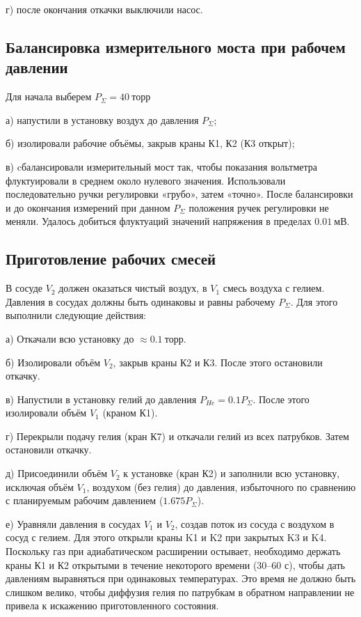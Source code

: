 \documentclass[a4paper, 10pt, twocolumn]{article}
\begin{document}
г) после окончания откачки выключили насос.

\subsection{Балансировка измерительного моста при рабочем давлении}

Для начала выберем $P_{\Sigma} = 40~торр$

а) напустили в установку воздух до давления $P_{\Sigma}$;

б) изолировали рабочие объёмы, закрыв краны К1, К2 (К3 открыт);

в) cбалансировали измерительный мост так, чтобы показания вольтметра флуктуировали в среднем около нулевого значения. Использовали последовательно ручки регулировки «грубо», затем «точно». После балансировки и до окончания измерений при данном $P_{\Sigma}$ положения ручек регулировки не меняли. Удалось добиться флуктуаций значений напряжения в пределах $0.01~мВ$.

\subsection{Приготовление рабочих смесей}

    В сосуде $V_2$ должен оказаться чистый воздух, в $V_1$ смесь воздуха с гелием. Давления в сосудах должны быть одинаковы и равны рабочему $P_{\Sigma}$. Для этого выполнили следующие действия:

    а) Откачали всю установку до $\approx 0.1~торр$.

    б) Изолировали объём $V_2$, закрыв краны К2 и К3. После этого остановили откачку.

    в) Напустили в установку гелий до давления $P_{He} = 0.1P_{\Sigma}$. После этого изолировали объём $V_1$ (краном К1).

    г) Перекрыли подачу гелия (кран К7) и откачали гелий из всех патрубков. Затем остановили откачку.

    д) Присоединили объём $V_2$ к установке (кран К2) и заполнили всю установку, исключая объём $V_1$, воздухом (без гелия) до давления, избыточного по сравнению с планируемым рабочим давлением ($1.675P_{\Sigma}$).

    е) Уравняли давления в сосудах $V_1$ и $V_2$, создав поток из сосуда с воздухом в сосуд с гелием. Для этого открыли краны K1 и K2 при закрытых K3 и K4. Поскольку газ при адиабатическом расширении остывает, необходимо держать краны К1 и К2 открытыми в течение некоторого времени (30–60 с), чтобы дать давлениям выравняться при одинаковых температурах. Это время не должно быть слишком велико, чтобы диффузия гелия по патрубкам в обратном направлении не привела к искажению приготовленного состояния.
\end{document}
